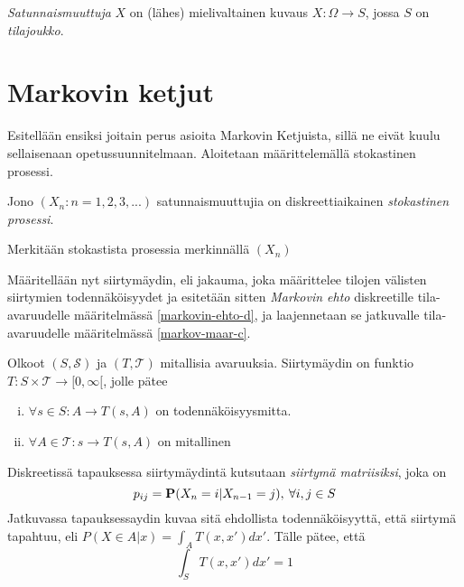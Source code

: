 \begin{maar}
	\textit{Satunnaismuuttuja} $X$ on (lähes) mielivaltainen kuvaus $X:\Omega\rightarrow S$, jossa $S$ on \textit{tilajoukko}. 
\end{maar}


\section{Markovin ketjut}

Esitellään ensiksi joitain perus asioita Markovin Ketjuista, sillä ne eivät kuulu sellaisenaan opetussuunnitelmaan. Aloitetaan määrittelemällä stokastinen prosessi.

\begin{maar}
	Jono $(X_n:n=1,2,3,...)$ satunnaismuuttujia on diskreettiaikainen \textit{stokastinen prosessi}.
\end{maar}

\begin{merk}
	Merkitään stokastista prosessia merkinnällä $( X_n )$
\end{merk}

Määritellään nyt siirtymäydin, eli jakauma, joka määrittelee tilojen välisten siirtymien todennäköisyydet ja esitetään sitten \textit{Markovin ehto} diskreetille tila-avaruudelle määritelmässä \ref{markovin-ehto-d}, ja laajennetaan se jatkuvalle tila-avaruudelle määritelmässä \ref{markov-maar-c}. \cite{monte_carlo_book}

\begin{maar}
	Olkoot $(S,\mathcal{S})$ ja $(T,\mathcal{T})$ mitallisia avaruuksia. Siirtymäydin on funktio $T:S\times \mathcal{T} \rightarrow [0,\infty[$, jolle pätee
	\begin{enumerate}[(i)]
		\item $\forall s \in S: A \rightarrow T(s,A)$ on todennäköisyysmitta.
		\item $\forall A \in \mathcal{T}: s \rightarrow T(s,A)$ on mitallinen
	\end{enumerate}
	Diskreetissä tapauksessa siirtymäydintä kutsutaan \textit{siirtymä matriisiksi}, joka on 
	\begin{equation}
		p_{ij} = \textbf{P}(X_n = i | X_{n-1} = j), \:\forall i,j \in S
	\end{equation}
	Jatkuvassa tapauksessaydin kuvaa sitä ehdollista todennäköisyyttä, että siirtymä tapahtuu, eli $P(X \in A|x) = \int_A T(x,x')dx'$. Tälle pätee, että 
	\begin{equation}\label{siirt-tiheys}
		\int_S T(x,x')dx' = 1
	\end{equation}
\end{maar}

